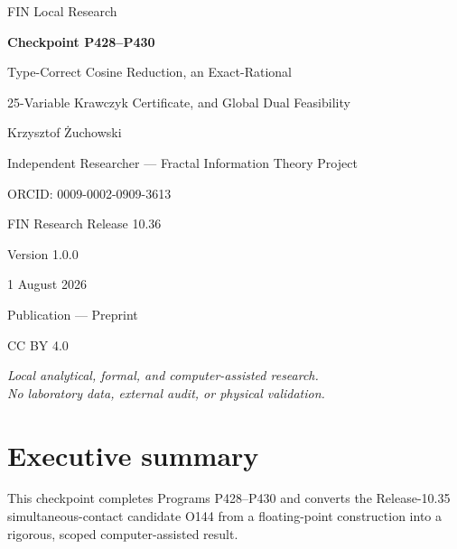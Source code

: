 \documentclass[11pt,a4paper]{article}
\begin{document}
\begin{titlepage}
\centering
{\Large FIN Local Research\par}
\vspace{0.8cm}
{\Huge\bfseries Checkpoint P428--P430\par}
\vspace{0.35cm}
{\Large Type-Correct Cosine Reduction, an Exact-Rational\par}
{\Large 25-Variable Krawczyk Certificate, and Global Dual Feasibility\par}
\vfill
{\large Krzysztof \.{Z}uchowski\par}
\vspace{0.22cm}
Independent Researcher --- Fractal Information Theory Project\par
ORCID: 0009-0002-0909-3613\par
\vspace{0.6cm}
FIN Research Release 10.36\par
Version 1.0.0\par
1 August 2026\par
Publication --- Preprint\par
CC BY 4.0\par
\vfill
\textit{Local analytical, formal, and computer-assisted research.\\
No laboratory data, external audit, or physical validation.}
\end{titlepage}

\tableofcontents
\newpage

\section{Executive summary}

This checkpoint completes Programs P428--P430 and converts the Release-10.35
simultaneous-contact candidate O144 from a floating-point construction into a
rigorous, scoped computer-assisted result.
\end{document}
